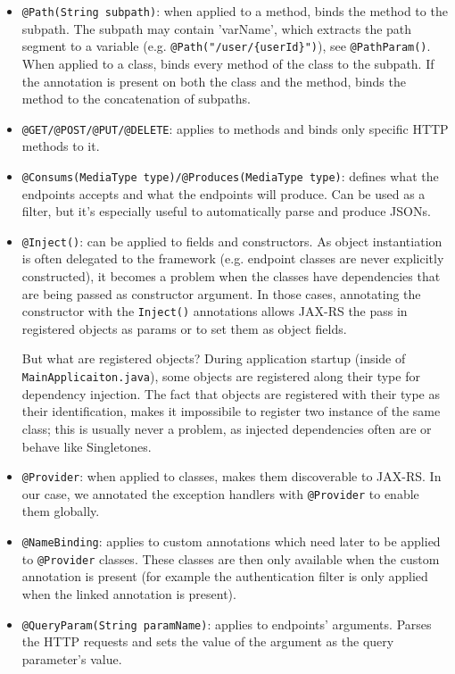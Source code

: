 \begin{itemize}
	\item \verb|@Path(String subpath)|: when applied to a method, binds the method to the subpath. The subpath may contain '{varName}', which extracts the path segment to a variable (e.g. \verb|@Path("/user/{userId}")|), see \verb|@PathParam()|. When applied to a class, binds every method of the class to the subpath. If the annotation is present on both the class and the method, binds the method to the concatenation of subpaths.
	\item \verb|@GET/@POST/@PUT/@DELETE|: applies to methods and binds only specific HTTP methods to it.
	\item \verb|@Consums(MediaType type)/@Produces(MediaType type)|: defines what the endpoints accepts and what the endpoints will produce. Can be used as a filter, but it's especially useful to automatically parse and produce JSONs.
	\item \verb|@Inject()|: can be applied to fields and constructors. As object instantiation is often delegated to the framework (e.g. endpoint classes are never explicitly constructed), it becomes a problem when the classes have dependencies that are being passed as constructor argument. In those cases, annotating the constructor with the \verb|Inject()| annotations allows JAX-RS the pass in registered objects as params or to set them as object fields.

	But what are registered objects? During application startup (inside of \texttt{MainApplicaiton.java}), some objects are registered along their type for dependency injection. The fact that objects are registered with their type as their identification, makes it impossibile to register two instance of the same class; this is usually never a problem, as injected dependencies often are or behave like Singletones.

	\item \verb|@Provider|: when applied to classes, makes them discoverable to JAX-RS. In our case, we annotated the exception handlers with \verb|@Provider| to enable them globally.

	\item \verb|@NameBinding|: applies to custom annotations which need later to be applied to \verb|@Provider| classes. These classes are then only available when the custom annotation is present (for example the authentication filter is only applied when the linked annotation is present).

	\item \verb|@QueryParam(String paramName)|: applies to endpoints' arguments. Parses the HTTP requests and sets the value of the argument as the query parameter's value.


\end{itemize}

